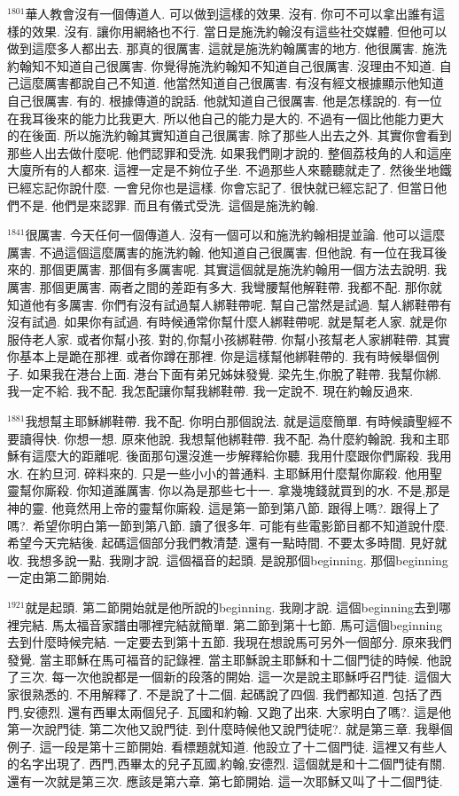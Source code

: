 \documentclass{book}
\begin{document}
$^{1801}$華人教會沒有一個傳道人.
可以做到這樣的效果.
沒有.
你可不可以拿出誰有這樣的效果.
沒有.
讓你用網絡也不行.
當日是施洗約翰沒有這些社交媒體.
但他可以做到這麼多人都出去.
那真的很厲害.
這就是施洗約翰厲害的地方.
他很厲害.
施洗約翰知不知道自己很厲害.
你覺得施洗約翰知不知道自己很厲害.
沒理由不知道.
自己這麼厲害都說自己不知道.
他當然知道自己很厲害.
有沒有經文根據顯示他知道自己很厲害.
有的.
根據傳道的說話.
他就知道自己很厲害.
他是怎樣說的.
有一位在我耳後來的能力比我更大.
所以他自己的能力是大的.
不過有一個比他能力更大的在後面.
所以施洗約翰其實知道自己很厲害.
除了那些人出去之外.
其實你會看到那些人出去做什麼呢.
他們認罪和受洗.
如果我們剛才說的.
整個荔枝角的人和這座大廈所有的人都來.
這裡一定是不夠位子坐.
不過那些人來聽聽就走了.
然後坐地鐵已經忘記你說什麼.
一會兒你也是這樣.
你會忘記了.
很快就已經忘記了.
但當日他們不是.
他們是來認罪.
而且有儀式受洗.
這個是施洗約翰.

$^{1841}$很厲害.
今天任何一個傳道人.
沒有一個可以和施洗約翰相提並論.
他可以這麼厲害.
不過這個這麼厲害的施洗約翰.
他知道自己很厲害.
但他說.
有一位在我耳後來的.
那個更厲害.
那個有多厲害呢.
其實這個就是施洗約翰用一個方法去說明.
我厲害.
那個更厲害.
兩者之間的差距有多大.
我彎腰幫他解鞋帶.
我都不配.
那你就知道他有多厲害.
你們有沒有試過幫人綁鞋帶呢.
幫自己當然是試過.
幫人綁鞋帶有沒有試過.
如果你有試過.
有時候通常你幫什麼人綁鞋帶呢.
就是幫老人家.
就是你服侍老人家.
或者你幫小孩.
對的,你幫小孩綁鞋帶.
你幫小孩幫老人家綁鞋帶.
其實你基本上是跪在那裡.
或者你蹲在那裡.
你是這樣幫他綁鞋帶的.
我有時候舉個例子.
如果我在港台上面.
港台下面有弟兄姊妹發覺.
梁先生,你脫了鞋帶.
我幫你綁.
我一定不給.
我不配.
我怎配讓你幫我綁鞋帶.
我一定說不.
現在約翰反過來.

$^{1881}$我想幫主耶穌綁鞋帶.
我不配.
你明白那個說法.
就是這麼簡單.
有時候讀聖經不要讀得快.
你想一想.
原來他說.
我想幫他綁鞋帶.
我不配.
為什麼約翰說.
我和主耶穌有這麼大的距離呢.
後面那句還沒進一步解釋給你聽.
我用什麼跟你們廝殺.
我用水.
在約旦河.
碎料來的.
只是一些小小的普通料.
主耶穌用什麼幫你廝殺.
他用聖靈幫你廝殺.
你知道誰厲害.
你以為是那些七十一.
拿幾塊錢就買到的水.
不是,那是神的靈.
他竟然用上帝的靈幫你廝殺.
這是第一節到第八節.
跟得上嗎?.
跟得上了嗎?.
希望你明白第一節到第八節.
讀了很多年.
可能有些電影節目都不知道說什麼.
希望今天完結後.
起碼這個部分我們教清楚.
還有一點時間.
不要太多時間.
見好就收.
我想多說一點.
我剛才說.
這個福音的起頭.
是說那個beginning.
那個beginning一定由第二節開始.

$^{1921}$就是起頭.
第二節開始就是他所說的beginning.
我剛才說.
這個beginning去到哪裡完結.
馬太福音家譜由哪裡完結就簡單.
第二節到第十七節.
馬可這個beginning去到什麼時候完結.
一定要去到第十五節.
我現在想說馬可另外一個部分.
原來我們發覺.
當主耶穌在馬可福音的記錄裡.
當主耶穌說主耶穌和十二個門徒的時候.
他說了三次.
每一次他說都是一個新的段落的開始.
這一次是說主耶穌呼召門徒.
這個大家很熟悉的.
不用解釋了.
不是說了十二個.
起碼說了四個.
我們都知道.
包括了西門,安德烈.
還有西畢太兩個兒子.
瓦國和約翰.
又跑了出來.
大家明白了嗎?.
這是他第一次說門徒.
第二次他又說門徒.
到什麼時候他又說門徒呢?.
就是第三章.
我舉個例子.
這一段是第十三節開始.
看標題就知道.
他設立了十二個門徒.
這裡又有些人的名字出現了.
西門,西畢太的兒子瓦國,約翰,安德烈.
這個就是和十二個門徒有關.
還有一次就是第三次.
應該是第六章.
第七節開始.
這一次耶穌又叫了十二個門徒.
\end{document}
